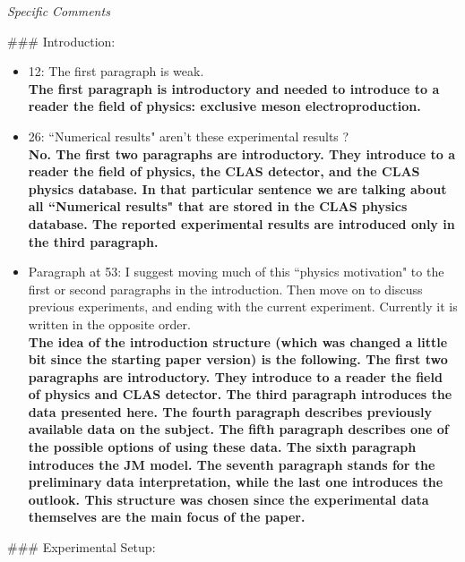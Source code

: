 \documentclass[,superscriptaddress,showpacs,amssymb,amsmath,amsfonts,linenumbers,article]{revtex4-1}
\begin{document}
\vspace{1cm}

\begin{center}
\large \it Specific Comments\\[0.5cm]
\end{center}

\#\#\# Introduction:\\[0.5cm]

\begin{itemize}

\item 12: The first paragraph is weak.\\[0.5cm]
{\bf The first paragraph is introductory and needed to introduce  to a reader the field of physics: exclusive meson electroproduction.}

\item 26: ``Numerical results" aren't these experimental results ?\\[0.5cm]
{\bf No. The first two paragraphs are introductory. They introduce to a reader the field of physics, the CLAS detector, and the CLAS physics database. In that particular sentence we are talking about all ``Numerical results" that are stored in the CLAS physics database. The reported experimental results are introduced only in the third paragraph.} 

\item Paragraph at 53: I suggest moving much of this ``physics motivation" to the first or second paragraphs in the introduction. Then move on to discuss previous experiments, and ending with the current experiment. Currently it is written in the opposite order.\\[0.5cm]
{\bf The idea of the introduction structure (which was changed a little bit since the starting paper version) is the following. The first two paragraphs are introductory. They introduce to a reader the field of physics and CLAS detector. The third paragraph introduces the data presented here. The fourth paragraph describes previously available data on the subject. The fifth paragraph describes one of the possible options of using these data. The sixth paragraph introduces the JM model. The seventh paragraph stands for the preliminary data interpretation, while the last one introduces the outlook. This structure was chosen since the experimental data themselves are the main focus of the paper.} 


\end{itemize}

\#\#\# Experimental Setup:\\[0.5cm]
\end{document}
